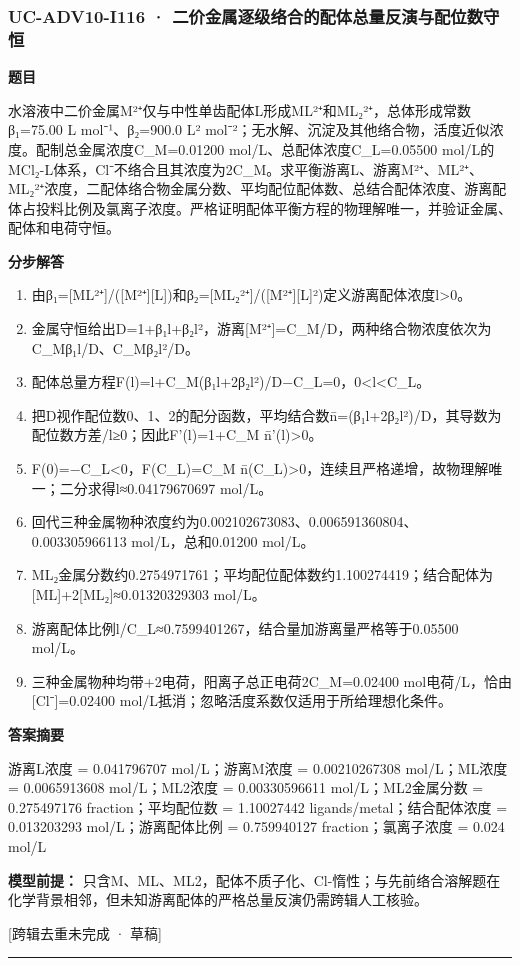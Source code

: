 \documentclass[UTF8,11pt,a4paper]{ctexart}
\begin{document}
\subsubsection*{UC-ADV10-I116 · 二价金属逐级络合的配体总量反演与配位数守恒}
\noindent\textbf{题目}\par
水溶液中二价金属M²⁺仅与中性单齿配体L形成ML²⁺和ML₂²⁺，总体形成常数β₁=75.00 L mol⁻¹、β₂=900.0 L² mol⁻²；无水解、沉淀及其他络合物，活度近似浓度。配制总金属浓度C\_M=0.01200 mol/L、总配体浓度C\_L=0.05500 mol/L的MCl₂-L体系，Cl⁻不络合且其浓度为2C\_M。求平衡游离L、游离M²⁺、ML²⁺、ML₂²⁺浓度，二配体络合物金属分数、平均配位配体数、总结合配体浓度、游离配体占投料比例及氯离子浓度。严格证明配体平衡方程的物理解唯一，并验证金属、配体和电荷守恒。\par
\medskip\noindent\textbf{分步解答}
\begin{enumerate}
\item 由β₁=[ML²⁺]/([M²⁺][L])和β₂=[ML₂²⁺]/([M²⁺][L]²)定义游离配体浓度l>0。
\item 金属守恒给出D=1+β₁l+β₂l²，游离[M²⁺]=C\_M/D，两种络合物浓度依次为C\_Mβ₁l/D、C\_Mβ₂l²/D。
\item 配体总量方程F(l)=l+C\_M(β₁l+2β₂l²)/D−C\_L=0，0<l<C\_L。
\item 把D视作配位数0、1、2的配分函数，平均结合数n̄=(β₁l+2β₂l²)/D，其导数为配位数方差/l≥0；因此F'(l)=1+C\_M n̄'(l)>0。
\item F(0)=−C\_L<0，F(C\_L)=C\_M n̄(C\_L)>0，连续且严格递增，故物理解唯一；二分求得l≈0.04179670697 mol/L。
\item 回代三种金属物种浓度约为0.002102673083、0.006591360804、0.003305966113 mol/L，总和0.01200 mol/L。
\item ML₂金属分数约0.2754971761；平均配位配体数约1.100274419；结合配体为[ML]+2[ML₂]≈0.01320329303 mol/L。
\item 游离配体比例l/C\_L≈0.7599401267，结合量加游离量严格等于0.05500 mol/L。
\item 三种金属物种均带+2电荷，阳离子总正电荷2C\_M=0.02400 mol电荷/L，恰由[Cl⁻]=0.02400 mol/L抵消；忽略活度系数仅适用于所给理想化条件。
\end{enumerate}
\noindent\textbf{答案摘要}\par
游离L浓度 = 0.041796707 mol/L；游离M浓度 = 0.00210267308 mol/L；ML浓度 = 0.0065913608 mol/L；ML2浓度 = 0.00330596611 mol/L；ML2金属分数 = 0.275497176 fraction；平均配位数 = 1.10027442 ligands/metal；结合配体浓度 = 0.013203293 mol/L；游离配体比例 = 0.759940127 fraction；氯离子浓度 = 0.024 mol/L\par
\noindent\textbf{模型前提：}
只含M、ML、ML2，配体不质子化、Cl-惰性；与先前络合溶解题在化学背景相邻，但未知游离配体的严格总量反演仍需跨辑人工核验。\par
\noindent\textcolor{red!65!black}{[跨辑去重未完成 · 草稿]} \par
\medskip\hrule\medskip
{}
\end{document}
